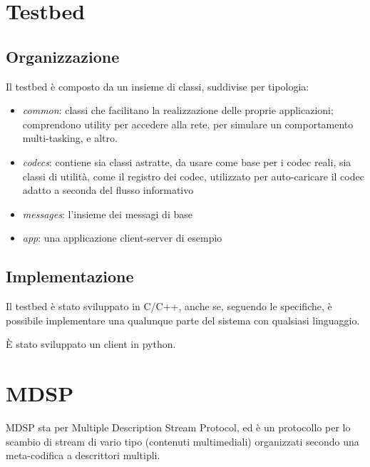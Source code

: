 \section{Testbed}



\subsection{Organizzazione}


Il testbed è composto da un insieme di classi, suddivise per tipologia:



\begin{itemize}
\item \emph{common}: classi che facilitano la realizzazione delle proprie
applicazioni; comprendono utility per accedere alla rete, per simulare un comportamento multi-tasking, e altro.

\item \emph{codecs}: contiene sia classi astratte, da usare come base per i
codec reali, sia classi di utilità, come il registro dei codec, utilizzato per auto-caricare il codec adatto a seconda del flusso informativo

\item \emph{messages}: l'insieme dei messagi di base
\item \emph{app}: una applicazione client-server di esempio
\end{itemize}




\subsection{Implementazione}


Il testbed è stato sviluppato in C/C++, anche se, seguendo le specifiche, è
possibile implementare una qualunque parte del sistema con qualsiasi linguaggio.

\`E stato sviluppato un client in python.



\section{MDSP}


MDSP sta per Multiple Description Stream Protocol, ed è un protocollo per lo
scambio di stream di vario tipo (contenuti multimediali) organizzati secondo una
meta-codifica a descrittori multipli.

